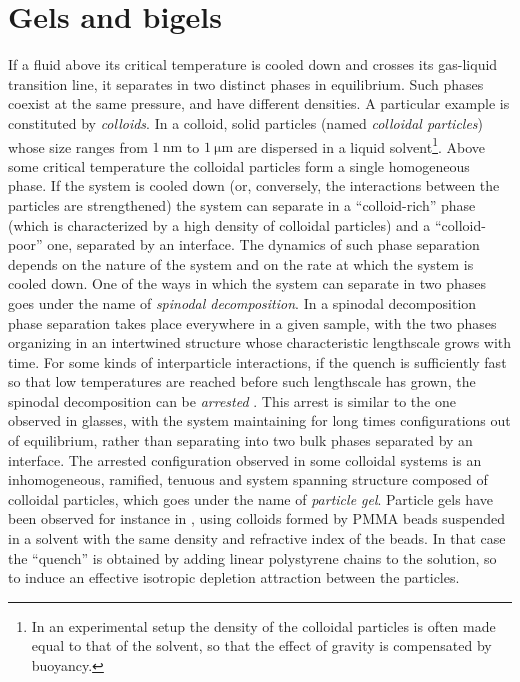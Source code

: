 \section*{Gels and bigels}

If a fluid above its critical temperature is cooled down and crosses its gas-liquid transition line, it separates in two distinct phases in equilibrium. Such phases coexist at the same pressure, and have different densities.
A particular example is constituted by \emph{colloids}. In a colloid, solid particles (named \emph{colloidal particles}) whose size ranges from $\SI{1}{\nano\metre}$ to $\SI{1}{\micro\metre}$ are dispersed in a liquid solvent\footnote{In an experimental setup the density of the colloidal particles is often made equal to that of the solvent, so that the effect of gravity is compensated by buoyancy.}. Above some critical temperature the colloidal particles form a single homogeneous phase. If the system is cooled down (or, conversely, the interactions between the particles are strengthened) the system can separate in a ``colloid-rich'' phase (which is characterized by a high density of colloidal particles) and a ``colloid-poor'' one, separated by an interface. The dynamics of such phase separation depends on the nature of the system and on the rate at which the system is cooled down. One of the ways in which the system can separate in two phases goes under the name of \emph{spinodal decomposition}. In a spinodal decomposition phase separation takes place everywhere in a given sample, with the two phases organizing in an intertwined structure whose characteristic lengthscale grows with time.
For some kinds of interparticle interactions, if the quench is sufficiently fast so that low temperatures are reached before such lengthscale has grown, the spinodal decomposition can be \emph{arrested} \cite{foffi2005scaling, foffi2005arrested, lu2008gelation}. This arrest is similar to the one observed in glasses, with the system maintaining for long times configurations out of equilibrium, rather than separating into two bulk phases separated by an interface. The arrested configuration observed in some colloidal systems is an inhomogeneous, ramified, tenuous and system spanning structure composed of colloidal particles, which goes under the name of \emph{particle gel}. Particle gels have been observed for instance in \cite{lu2008gelation}, using colloids formed by PMMA beads suspended in a solvent with the same density and refractive index of the beads. In that case the ``quench'' is obtained by adding linear polystyrene chains to the solution, so to induce an effective isotropic depletion attraction \cite{likos2001effective} between the particles.
